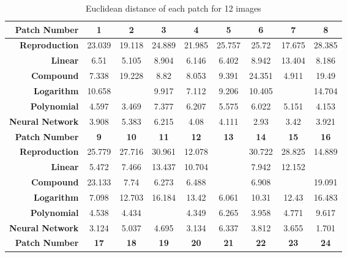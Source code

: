\begin{table}[H]
  \caption{Euclidean distance of each patch for 12 images }
  \begin{center}
    \begin{tabularx}{\textwidth}{r c c c c c c c c}
    \toprule
        \textbf{Patch Number} & \textbf{1} & \textbf{2} & \textbf{3} & \textbf{4} & \textbf{5} & \textbf{6} & \textbf{7} & \textbf{8}\\ \midrule 
        \textbf{Reproduction} &23.039 &19.118 &24.889 &21.985 &25.757 &25.72 &17.675 &28.385\\ 
        \textbf{Linear} &6.51 &5.105 &8.904 &6.146 &6.402 &8.942 &13.404 &8.186\\ 
        \textbf{Compound} &7.338 &19.228 &8.82 &8.053 &9.391 &24.351 &4.911 &19.49\\ 
        \textbf{Logarithm} &10.658 &\cellcolor{colorgreen}{3.084} &9.917 &7.112 &9.206 &10.405 &\cellcolor{colorred}{18.933} &14.704\\ 
        \textbf{Polynomial} &4.597 &3.469 &7.377 &6.207 &5.575 &6.022 &5.151 &4.153\\ 
        \textbf{Neural Network} &3.908 &5.383 &6.215 &4.08 &4.111 &2.93 &3.42 &3.921\\ \midrule 
        \textbf{Patch Number} & \textbf{9} & \textbf{10} & \textbf{11} & \textbf{12} & \textbf{13} & \textbf{14} & \textbf{15} & \textbf{16}\\ \midrule 
        \textbf{Reproduction} &25.779 &27.716 &30.961 &12.078 &\cellcolor{colorred}{31.537} &30.722 &28.825 &14.889\\ 
        \textbf{Linear} &5.472 &7.466 &13.437 &10.704 &\cellcolor{colorgreen}{4.744} &7.942 &12.152 &\cellcolor{colorred}{15.425}\\ 
        \textbf{Compound} &23.133 &7.74 &6.273 &6.488 &\cellcolor{colorgreen}{4.607} &6.908 &\cellcolor{colorred}{29.981} &19.091\\ 
        \textbf{Logarithm} &7.098 &12.703 &16.184 &13.42 &6.061 &10.31 &12.43 &16.483\\ 
        \textbf{Polynomial} &4.538 &4.434 &\cellcolor{colorred}{12.564} &4.349 &6.265 &3.958 &4.771 &9.617\\ 
        \textbf{Neural Network} &3.124 &5.037 &4.695 &3.134 &6.337 &3.812 &3.655 &1.701\\ \midrule 
        \textbf{Patch Number} & \textbf{17} & \textbf{18} & \textbf{19} & \textbf{20} & \textbf{21} & \textbf{22} & \textbf{23} & \textbf{24}\\ \midrule 

\end{tabularx}
\end{center}
\end{table}
